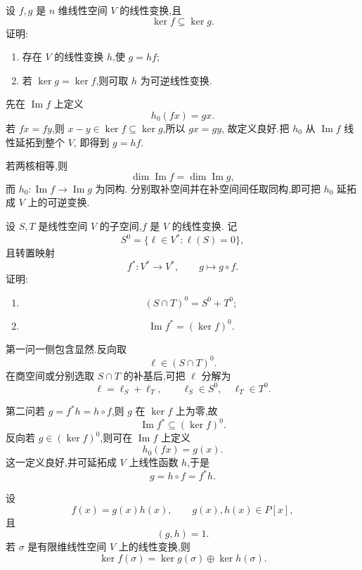 \begin{example}
设 $f,g$ 是 $n$ 维线性空间 $V$ 的线性变换,且
\[
\ker f\subseteq\ker g.
\]
证明:
\begin{enumerate}
    \item 存在 $V$ 的线性变换 $h$,使 $g=hf$;
    \item 若 $\ker g=\ker f$,则可取 $h$ 为可逆线性变换.
\end{enumerate}
\end{example}
\exampleblank

\begin{solution}
先在 $\operatorname{Im}f$ 上定义
\[
h_0(fx)=gx.
\]
若 $fx=fy$,则 $x-y\in\ker f\subseteq\ker g$,所以 $gx=gy$,
故定义良好.把 $h_0$ 从 $\operatorname{Im}f$ 线性延拓到整个 $V$,
即得到 $g=hf$.

若两核相等,则
\[
\dim\operatorname{Im}f=\dim\operatorname{Im}g,
\]
而 $h_0:\operatorname{Im}f\to\operatorname{Im}g$ 为同构.
分别取补空间并在补空间间任取同构,即可把 $h_0$ 延拓成 $V$ 上的可逆变换.
\end{solution}


\begin{example}
设 $S,T$ 是线性空间 $V$ 的子空间,$f$ 是 $V$ 的线性变换.
记
\[
S^0=\{\ell\in V^*:\ell(S)=0\},
\]
且转置映射
\[
f^*:V^*\to V^*,\qquad
g\mapsto g\circ f.
\]
证明:
\begin{enumerate}
    \item
    \[
    (S\cap T)^0=S^0+T^0;
    \]
    \item
    \[
    \operatorname{Im}f^*=(\ker f)^0.
    \]
\end{enumerate}
\end{example}
\exampleblank

\begin{solution}
第一问一侧包含显然.反向取
\[
\ell\in(S\cap T)^0.
\]
在商空间或分别选取 $S\cap T$ 的补基后,可把 $\ell$ 分解为
\[
\ell=\ell_S+\ell_T,
\qquad
\ell_S\in S^0,\quad \ell_T\in T^0.
\]

第二问若 $g=f^*h=h\circ f$,则 $g$ 在 $\ker f$ 上为零,故
\[
\operatorname{Im}f^*\subseteq(\ker f)^0.
\]
反向若 $g\in(\ker f)^0$,则可在 $\operatorname{Im}f$ 上定义
\[
h_0(fx)=g(x).
\]
这一定义良好,并可延拓成 $V$ 上线性函数 $h$,于是
\[
g=h\circ f=f^*h.
\]
\end{solution}


\begin{theorem}[\marktwostar]
设
\[
f(x)=g(x)h(x),
\qquad
g(x),h(x)\in P[x],
\]
且
\[
(g,h)=1.
\]
若 $\sigma$ 是有限维线性空间 $V$ 上的线性变换,则
\[
\ker f(\sigma)
=
\ker g(\sigma)\oplus\ker h(\sigma).
\]
\end{theorem}

